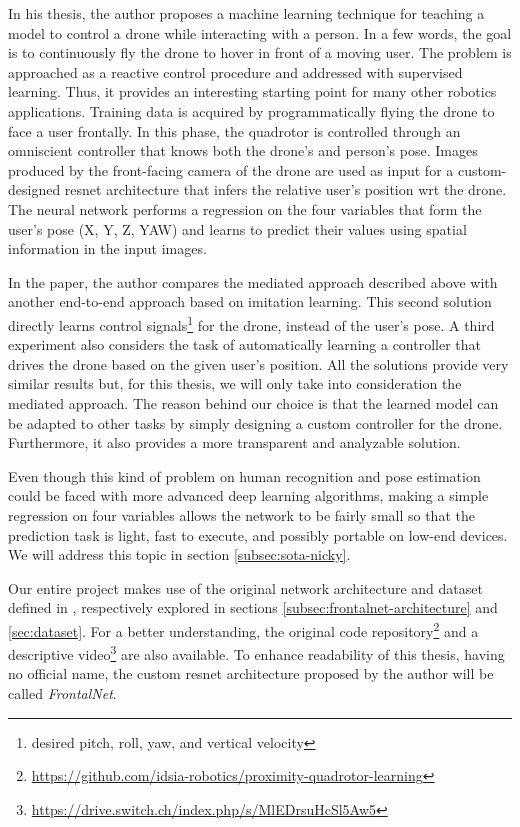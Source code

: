 In his thesis, the author proposes a machine learning technique for teaching a model to control a drone while interacting with a person. In a few words, the goal is to continuously fly the drone to hover in front of a moving user. The problem is approached as a reactive control procedure and addressed with supervised learning. Thus, it provides an interesting starting point for many other robotics applications. Training data is acquired by programmatically flying the drone to face a user frontally. In this phase, the quadrotor is controlled through an omniscient controller that knows both the drone's and person's pose. Images produced by the front-facing camera of the drone are used as input for a custom-designed \gls{resnet} architecture that infers the relative user's position \gls{wrt} the drone. The neural network performs a regression on the four variables that form the user's pose (X, Y, Z, YAW) and learns to predict their values using spatial information in the input images.

In the paper, the author compares the mediated approach described above with another end-to-end approach based on imitation learning. This second solution directly learns control signals\footnote{desired pitch, roll, yaw, and vertical velocity} for the drone, instead of the user's pose. A third experiment also considers the task of automatically learning a controller that drives the drone based on the given user's position. All the solutions provide very similar results but, for this thesis, we will only take into consideration the mediated approach. The reason behind our choice is that the learned model can be adapted to other tasks by simply designing a custom controller for the drone. Furthermore, it also provides a more transparent and analyzable solution.

Even though this kind of problem on human recognition and pose estimation could be faced with more advanced deep learning algorithms, making a simple regression on four variables allows the network to be fairly small so that the prediction task is light, fast to execute, and possibly portable on low-end devices. We will address this topic in section \ref{subsec:sota-nicky}.

\medskip

Our entire project makes use of the original network architecture and dataset defined in \cite{mantegazza2019visionbased}, respectively explored in sections \ref{subsec:frontalnet-architecture} and \ref{sec:dataset}. For a better understanding, the original code repository\footnote{\url{https://github.com/idsia-robotics/proximity-quadrotor-learning}} and a descriptive video\footnote{\url{https://drive.switch.ch/index.php/s/MlEDrsuHcSl5Aw5}} are also available. To enhance readability of this thesis, having no official name, the custom \gls{resnet} architecture proposed by the author will be called \textit{FrontalNet}.


